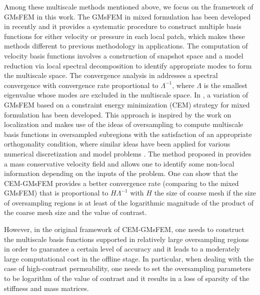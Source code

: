 \documentclass{article}[11pt]
\theoremstyle{definition}
\begin{document}

Among these multiscale methods mentioned above, we focus on the framework of GMsFEM in this work. The GMsFEM in mixed formulation has been developed in \cite{chung2015mixedg,efendiev2013mini} recently and it provides a systematic procedure to construct multiple basis functions for either velocity or pressure in each local patch, which makes these methods different to previous methodology in applications. The computation of velocity basis functions involves a construction of snapshot space and a model reduction via local spectral decomposition to identify appropriate modes to form the multiscale space. The convergence analysis in \cite{chung2015mixedg} addresses a spectral convergence with convergence rate proportional to $\Lambda^{-1}$, where $\Lambda$ is the smallest eigenvalue whose modes are excluded in the multiscale space. %
In \cite{chung2018constraintmixed}, a variation of GMsFEM based on a constraint energy minimization (CEM) strategy for mixed formulation has been developed. 
This approach is inspired by the work on localization \cite{maalqvist2014localization,owhadi2017multigrid,owhadi2014polyharmonic} 
and makes use of the ideas of oversampling to compute multiscale basis functions in oversampled subregions with the satisfaction of an appropriate orthogonality condition, where similar ideas have been applied for various numerical discretization and model problems \cite{chung2018constraint,cheung2018mc,cheung2020wave,chung2020wave,li2019parabolic,cheung2019dg}. 
The method proposed in \cite{chung2018constraintmixed} provides a mass conservative velocity field and allows one to identify some non-local information depending on the inputs of the problem. 
One can show that the CEM-GMsFEM provides a better convergence rate (comparing to the mixed GMsFEM) that is proportional to $H\Lambda^{-1}$ with $H$ the size of coarse mesh if the size of oversampling regions is at least of the logarithmic magnitude of the product of the coarse mesh size and the value of contrast. 


However, in the original framework of CEM-GMsFEM, one needs to construct the multiscale basis functions supported in relatively large oversampling regions in order to guarantee a certain level of accuracy and it leads to a moderately large computational cost in the offline stage. 
In particular, when dealing with the case of high-contrast permeability, one needs to set the oversampling parameters to be logarithm of the value of contrast and it results in a loss of sparsity of the stiffness and mass matrices. 
\end{document}

